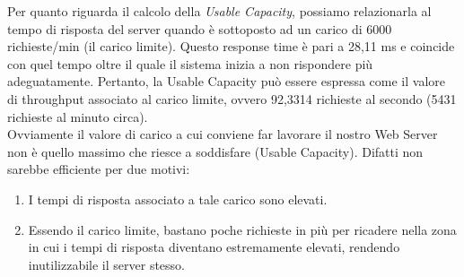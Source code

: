 Per quanto riguarda il calcolo della \textit{Usable Capacity}, possiamo relazionarla al tempo di risposta del server quando è sottoposto ad un carico di 6000 richieste/min (il carico limite). Questo response time è pari a 28,11 ms e coincide con quel tempo oltre il quale il sistema inizia a non rispondere più adeguatamente. Pertanto, la Usable Capacity può essere espressa come il valore di throughput associato al carico limite, ovvero 92,3314 richieste al secondo (5431 richieste al minuto circa).
\\
Ovviamente il valore di carico a cui conviene far lavorare il nostro Web Server non è quello massimo che riesce a soddisfare (Usable Capacity). Difatti non sarebbe efficiente per due motivi:
\begin{enumerate}
	\item I tempi di risposta associato a tale carico sono elevati.
	\item Essendo il carico limite, bastano poche richieste in più per ricadere nella zona in cui i tempi di risposta diventano estremamente elevati, rendendo inutilizzabile il server stesso. 
\end{enumerate}
